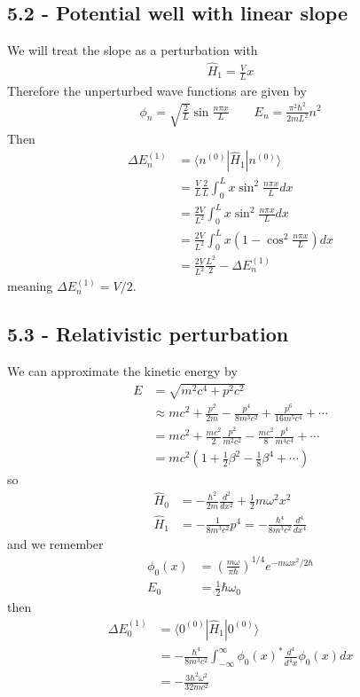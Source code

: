 \documentclass[../main.tex]{subfiles}
\begin{document}
\subsection{5.2 - Potential well with linear slope}
We will treat the slope as a perturbation with
\begin{align}
\hat{H}_1=\frac{V}{L}x
\end{align} 
Therefore the unperturbed wave functions are given by
\begin{align}
\phi_n=\sqrt{\frac{2}{L}}\sin\frac{n\pi x}{L}\qquad
E_n=\frac{\pi^2\hbar^2}{2mL^2}n^2
\end{align}
Then
\begin{align}
\Delta E_n^{(1)}
&=\langle n^{(0)}|\hat{H}_1|n^{(0)}\rangle\\
&=\frac{V}{L}\frac{2}{L}\int_0^L x\sin^2\frac{n\pi x}{L}dx\\
&=\frac{2V}{L^2}\int_0^L x\sin^2\frac{n\pi x}{L}dx\\
&=\frac{2V}{L^2}\int_0^L x\left(1-\cos^2\frac{n\pi x}{L}\right)dx\\
&=\frac{2V}{L^2}\frac{L^2}{2}-\Delta E_n^{(1)}
\end{align}
meaning $\Delta E_n^{(1)}=V/2$.

\subsection{5.3 - Relativistic perturbation}
We can approximate the kinetic energy by
\begin{align}
E&=\sqrt{m^2c^4+p^2c^2}\\
&\approx mc^2+\frac{p^2}{2m}-\frac{p^4}{8m^3c^2}+\frac{p^6}{16m^5c^4}+\cdots\\
&=mc^2+\frac{mc^2}{2}\frac{p^2}{m^2c^2}-\frac{mc^2}{8}\frac{p^4}{m^4c^4}+\cdots\\
&=mc^2\left(1+\frac{1}{2}\beta^2-\frac{1}{8}\beta^4+\cdots\right)
\end{align}
so
\begin{align}
\hat{H}_0&=-\frac{\hbar^2}{2m}\frac{d^2}{dx^2}+\frac{1}{2}m\omega^2x^2\\
\hat{H}_1&=-\frac{1}{8m^3c^2}p^4=-\frac{\hbar^4}{8m^3c^2}\frac{d^4}{dx^4}
\end{align}
and we remember
\begin{align}
\phi_0(x)&=\left(\frac{m\omega}{\pi\hbar}\right)^{1/4}e^{-m\omega x^2/2\hbar}\\
E_0&=\frac{1}{2}\hbar\omega_0
\end{align}
then
\begin{align}
\Delta E_0^{(1)}&=\langle 0^{(0)}|\hat{H}_1|0^{(0)}\rangle\\
&=-\frac{\hbar^4}{8m^3c^2}\int_{-\infty}^\infty\phi_0(x)^*\frac{d^4}{d^4x}\phi_0(x)dx\\
&=-\frac{3\hbar^2\omega^2}{32mc^2}
\end{align}
\end{document}
